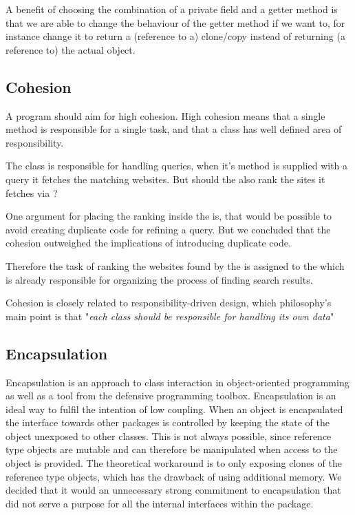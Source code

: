 A benefit of choosing the combination of a private field and a getter method is that we are able to change the behaviour of the getter method if we want to, for instance change it to return a (reference to a) clone/copy instead of returning (a reference to) the actual object. 


\subsection{Cohesion}
A program should aim for high cohesion. %
High cohesion means that a single method is responsible for a single task, and that a class has well defined area of responsibility. 

The class  is responsible for handling queries, when it's method  is supplied with a query it fetches the matching websites. But should the  also rank the sites it fetches via ? 

One argument for placing the ranking inside the  is, that would be possible to avoid creating duplicate code for refining a query. But we concluded that the cohesion outweighed the implications of introducing duplicate code.

Therefore the task of ranking the websites found by the  is assigned to the   which is already responsible for organizing the process of finding search results.

Cohesion is closely related to responsibility-driven design, which philosophy's main point is that "\textit{each class should be responsible for handling its own data}" %

\subsection{Encapsulation}
Encapsulation is an approach to class interaction in object-oriented programming as well as a tool from the defensive programming toolbox. Encapsulation is an ideal way to fulfil the intention of low coupling. When an object is encapsulated the interface towards other packages is controlled by keeping the state of the object unexposed to other classes. This is not always possible, since reference type objects are mutable and can therefore be manipulated when access to the object is provided. The theoretical workaround is to only exposing clones of the reference type objects, which has the drawback of using additional memory. We decided that it would an unnecessary strong commitment to encapsulation that did not serve a purpose for all the internal interfaces within the  package.

